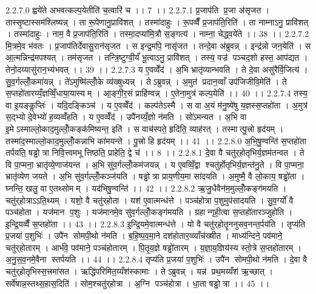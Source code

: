2.2.7.0
ह्वये॑ते अभवत्कल्प॒येतीति॑ च॒त्वारि॑ च ।। 7 ।।
2.2.7.1
प्र॒जाप॑ति प्र॒जा अ॑सृजत । तास्सृ॒ष्टास्सम॑श्लिष्यन्न् । ता रू॒पेणानु॒प्रावि॑शत् । तस्मा॑दाहुः । रू॒पव्वैँ प्र॒जाप॑ति॒रिति॑ । ता नाम्नाऽनु॒ प्रावि॑शत् । तस्मा॑दाहुः । नाम॒ वै प्र॒जाप॑ति॒रिति॑ । तस्मा॒दप्या॑मि॒त्रौ स॒ङ्गत्य॑ । नाम्ना॒ चेद्ध्वये॑ते ।। 38 ।।
2.2.7.2
मि॒त्रमे॒व भ॑वतः । प्र॒जाप॑तिर्देवासु॒रान॑सृजत । स इन्द्र॒मपि॒ नासृ॑जत । तन्दे॒वा अ॑ब्रुवन्न् । इन्द्र॑न्नो जन॒येति॑ । स आ॒त्मन्निन्द्र॑मपश्यत् । तम॑सृजत । तन्त्रि॒ष्टुग्वी॒र्यं॑ भू॒त्वाऽनु॒ प्रावि॑शत् । तस्य॒ वज्र॑ पञ्चद॒शो हस्त॒ आप॑द्यत । तेनो॒दय्यासु॑रान॒भ्य॑भवत् ।। 39 ।।
2.2.7.3
य ए॒वव्वेँद॑ । अ॒भि भ्रातृ॑व्यान्भवति । ते दे॒वा असु॑रैर्वि॒जित्य॑ । सु॒व॒र्गल्लोँ॒कमा॑यन्न् । ते॑ऽमुष्मि॑ल्लोँ॒के व्य॑ख्षुध्यन्न् । तेऽब्रुवन्न् । अ॒मुत॑ प्रदान॒व्वाँ उप॑जिजीवि॒मेति॑ । ते स॒प्तहो॑तारय्यँ॒ज्ञव्विँ॒धाया॒यास्यम् । आ॒ङ्गी॒र॒सं प्राहि॑ण्वन्न् । ए॒तेना॒मुत्र॑ कल्प॒येति॑ ।। 40 ।।
2.2.7.4
तस्य॒ वा इ॒यङ्कॢप्तिः॑ । यदि॒दङ्किञ्च॑ । य ए॒वव्वेँद॑ । कल्प॑तेऽस्मै । स वा अ॒यं म॑नु॒ष्ये॑षु य॒ज्ञस्स॒प्तहो॑ता । अ॒मुत्र॑ स॒द्भ्यो दे॒वेभ्यो॑ ह॒व्यव्वँ॑हति । य ए॒वव्वेँद॑ । उपै॑नय्यँ॒ज्ञो न॑मति । सो॑ऽमन्यत । अ॒भि वा इ॒मेऽस्माल्लो॒काद॒मुल्लोँ॒कङ्क॑मिष्यन्त॒ इति॑ । स वाच॑स्पते॒ हृदिति॒ व्याह॑रत् । तस्मात्पु॒त्त्रो हृद॑यम् । तस्मा॑द॒स्माल्लो॒काद॒मुल्लोँ॒कन्नाभि का॑मयन्ते । पु॒त्त्रो हि हृद॑यम् ।। 41 ।।
2.2.8.0
अ॒भि॒षु॒ण्वन्ति॑ स॒प्तहो॑ता तर्पयति॒ षड्ढोत्रा निवि॒त्त्वमभूत्तिष्ठति॒ प्राहेति॒ द्वे च॑ ।। 8 ।।
2.2.8.1
दे॒वा वै चतु॑र्‌होतृभिर्य॒ज्ञम॑तन्वत । ते वि पा॒प्मना॒ भ्रातृ॑व्ये॒णाज॑यन्त । अ॒भि सु॑व॒र्गल्लोँ॒कम॑जयन्न् । य ए॒वव्विँ॒द्वा श्चतु॑र्होतृभिर्य॒ज्ञन्त॑नु॒ते । वि पा॒प्मना॒ भ्रातृ॑व्येण जयते । अ॒भि सु॑व॒र्गल्लोँ॒कञ्ज॑यति । षड्ढोत्रा प्राय॒णीय॒मा सा॑दयति । अ॒मुष्मै॒ वै लो॒काय॒ षड्ढो॑ता । घ्नन्ति॒ खलु॒ वा ए॒तथ्सोमम् । यद॑भिषु॒ण्वन्ति॑ ।। 42 ।।
2.2.8.2
ऋ॒जु॒धैवैन॑म॒मुल्लोँ॒कङ्ग॑मयति । चतु॑र्‌होत्राऽऽति॒थ्यम् । यशो॒ वै चतु॑र्‌होता । यश॑ ए॒वात्मन्ध॑त्ते । पञ्च॑होत्रा प॒शुमुप॑सादयति । सु॒व॒र्ग्यो॑ वै पञ्च॑होता । यज॑मान प॒शुः । यज॑मानमे॒व सु॑व॒र्गल्लोँ॒कङ्ग॑मयति । ग्रहान्गृही॒त्वा स॒प्तहो॑तारञ्जुहोति । इ॒न्द्रि॒यव्वैँ स॒प्तहो॑ता ।। 43 ।।
2.2.8.3
इ॒न्द्रि॒यमे॒वात्मन्ध॑त्ते । यो वै चतु॑र्‌होतॄननुसव॒नन्त॒र्पय॑ति । तृप्य॑ति प्र॒जया॑ प॒शुभिः॑ । उपै॑न सोमपी॒थो न॑मति । ब॒हि॒ष्प॒व॒मा॒ने दश॑होतार॒व्व्याँच॑ख्षीत । माध्य॑न्दिने॒ पव॑माने॒ चतु॑र्‌होतारम् । आर्भ॑वे॒ पव॑माने॒ पञ्च॑होतारम् । पि॒तृ॒य॒ज्ञे षड्ढो॑तारम् । य॒ज्ञा॒य॒ज्ञिय॑स्य स्तो॒त्रे स॒प्तहो॑तारम् । अ॒नु॒स॒व॒नमे॒वैना॑ स्तर्पयति ।। 44 ।।
2.2.8.4
तृप्य॑ति प्र॒जया॑ प॒शुभिः॑ । उपै॑न सोमपी॒थो न॑मति । दे॒वा वै चतु॑र्‌होतृभिस्स॒त्त्रमा॑सत । ऋद्धि॑परिमित॒य्यँश॑स्कामाः । तेऽब्रुवन्न् । यन्न॑ प्रथ॒मय्यँश॑ ऋ॒च्छात् । सर्वे॑षान्न॒स्तथ्स॒हास॒दिति॑ । सोम॒श्चतु॑र्‌होत्रा । अ॒ग्नि पञ्च॑होत्रा । धा॒ता षड्ढोत्रा ।। 45 ।।
